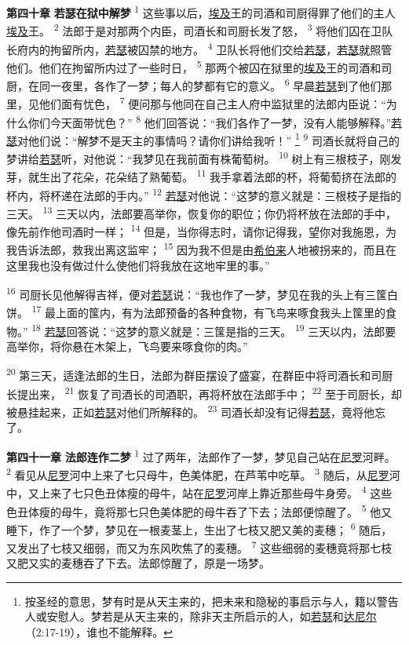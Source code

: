 \textbf{第四十章 }
\textbf{若瑟在狱中解梦 }
\textsuperscript{1}
这些事以后，\uline{埃及}王的司酒和司厨得罪了他们的主人\uline{埃及}王。
\textsuperscript{2}
法郎于是对那两个内臣，司酒长和司厨长发了怒，
\textsuperscript{3}
将他们囚在卫队长府内的拘留所内，\uline{若瑟}被囚禁的地方。
\textsuperscript{4}
卫队长将他们交给\uline{若瑟}，\uline{若瑟}就照管他们。他们在拘留所内过了一些时日，
\textsuperscript{5}
那两个被囚在狱里的\uline{埃及}王的司酒和司厨，在同一夜里，各作了一梦；每人的梦都有它的意义。
\textsuperscript{6}
早晨\uline{若瑟}到了他们那里，见他们面有忧色，
\textsuperscript{7}
便问那与他同在自己主人府中监狱里的法郎内臣说：“为什么你们今天面带忧色？”
\textsuperscript{8}
他们回答说：“我们各作了一梦，没有人能够解释。”\uline{若瑟}对他们说：“解梦不是天主的事情吗？请你们讲给我听！”
\footnote{按圣经的意思，梦有时是从天主来的，把未来和隐秘的事启示与人，籍以警告人或安慰人。梦若是从天主来的，除非天主所启示的人，如\uline{若瑟}和\uline{达尼尔}（2:17-19），谁也不能解释。}
\textsuperscript{9}
司酒长就将自己的梦讲给\uline{若瑟}听，对他说：“我梦见在我前面有株葡萄树。
\textsuperscript{10}
树上有三根枝子，刚发芽，就生出了花朵，花朵结了熟葡萄。
\textsuperscript{11}
我手拿着法郎的杯，将葡萄挤在法郎的杯内，将杯递在法郎的手内。”
\textsuperscript{12}
\uline{若瑟}对他说：“这梦的意义就是：三根枝子是指的三天。
\textsuperscript{13}
三天以内，法郎要高举你，恢复你的职位；你仍将杯放在法郎的手中，像先前作他司酒时一样；
\textsuperscript{14}
但是，当你得志时，请你记得我，望你对我施恩，为我告诉法郎，救我出离这监牢；
\textsuperscript{15}
因为我不但是由\uline{希伯来}人地被拐来的，而且在这里我也没有做过什么使他们将我放在这地牢里的事。”

\textsuperscript{16}
司厨长见他解得吉祥，便对\uline{若瑟}说：“我也作了一梦，梦见在我的头上有三筺白饼。
\textsuperscript{17}
最上面的筺内，有为法郎预备的各种食物，有飞鸟来啄食我头上筺里的食物。”
\textsuperscript{18}
\uline{若瑟}回答说：“这梦的意义就是：三筺是指的三天。
\textsuperscript{19}
三天以内，法郎要高举你，将你悬在木架上，飞鸟要来啄食你的肉。”

\textsuperscript{20}
第三天，适逢法郎的生日，法郎为群臣摆设了盛宴，在群臣中将司酒长和司厨长提出来，
\textsuperscript{21}
恢复了司酒长的司酒职，再将杯放在法郎手中；
\textsuperscript{22}
至于司厨长，却被悬挂起来，正如\uline{若瑟}对他们所解释的。
\textsuperscript{23}
司酒长却没有记得\uline{若瑟}，竟将他忘了。

\textbf{第四十一章 }
\textbf{法郎连作二梦 }
\textsuperscript{1}
过了两年，法郎作了一梦，梦见自己站在\uline{尼罗}河畔。
\textsuperscript{2}
看见从\uline{尼罗}河中上来了七只母牛，色美体肥，在芦苇中吃草。
\textsuperscript{3}
随后，从\uline{尼罗}河中，又上来了七只色丑体瘦的母牛，站在\uline{尼罗}河岸上靠近那些母牛身旁。
\textsuperscript{4}
这些色丑体瘦的母牛，竟将那七只色美体肥的母牛吞了下去；法郎便惊醒了。
\textsuperscript{5}
他又睡下，作了一个梦，梦见在一根麦茎上，生出了七枝又肥又美的麦穗；
\textsuperscript{6}
随后，又发出了七枝又细弱，而又为东风吹焦了的麦穗。
\textsuperscript{7}
这些细弱的麦穗竟将那七枝又肥又实的麦穗吞了下去。法郎惊醒了，原是一场梦。

